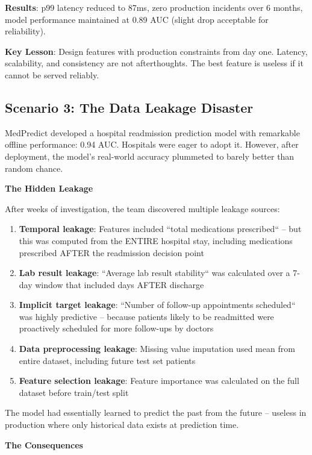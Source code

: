 \textbf{Results}: p99 latency reduced to 87ms, zero production incidents over 6 months, model performance maintained at 0.89 AUC (slight drop acceptable for reliability).

\textbf{Key Lesson}: Design features with production constraints from day one. Latency, scalability, and consistency are not afterthoughts. The best feature is useless if it cannot be served reliably.

\subsection{Scenario 3: The Data Leakage Disaster}

MedPredict developed a hospital readmission prediction model with remarkable offline performance: 0.94 AUC. Hospitals were eager to adopt it. However, after deployment, the model's real-world accuracy plummeted to barely better than random chance.

\textbf{The Hidden Leakage}

After weeks of investigation, the team discovered multiple leakage sources:

\begin{enumerate}
    \item \textbf{Temporal leakage}: Features included ``total medications prescribed`` -- but this was computed from the ENTIRE hospital stay, including medications prescribed AFTER the readmission decision point
    \item \textbf{Lab result leakage}: ``Average lab result stability`` was calculated over a 7-day window that included days AFTER discharge
    \item \textbf{Implicit target leakage}: ``Number of follow-up appointments scheduled`` was highly predictive -- because patients likely to be readmitted were proactively scheduled for more follow-ups by doctors
    \item \textbf{Data preprocessing leakage}: Missing value imputation used mean from entire dataset, including future test set patients
    \item \textbf{Feature selection leakage}: Feature importance was calculated on the full dataset before train/test split
\end{enumerate}

The model had essentially learned to predict the past from the future -- useless in production where only historical data exists at prediction time.

\textbf{The Consequences}

